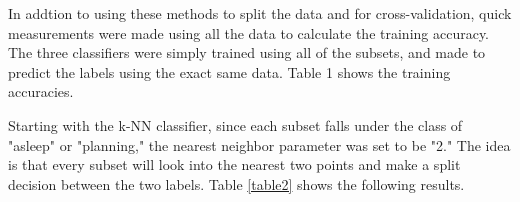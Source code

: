 \documentclass[conference,compsoc]{IEEEtran}
\begin{document}
In addtion to using these methods to split the data and for cross-validation, quick measurements were made using all the data to calculate the training accuracy. The three classifiers were simply trained using all of the subsets, and made to predict the labels using the exact same data. Table 1 shows the training accuracies.

\begin{table}[h]
	\caption{Training Accuracies}
	\label{table1}
\noindent{}	

\end{table}

Starting with the k-NN classifier, since each subset falls under the class of "asleep" or "planning," the nearest neighbor parameter 
was set to be "2." The idea is that every subset will look into the nearest two points and make a split decision between the two labels. 
Table \ref{table2} shows the following results.
\begin{table*}
	\caption{Accuracies for k-NN Classifier}
	\label{table2}
	\noindent{}

\end{table*}
\end{document}
